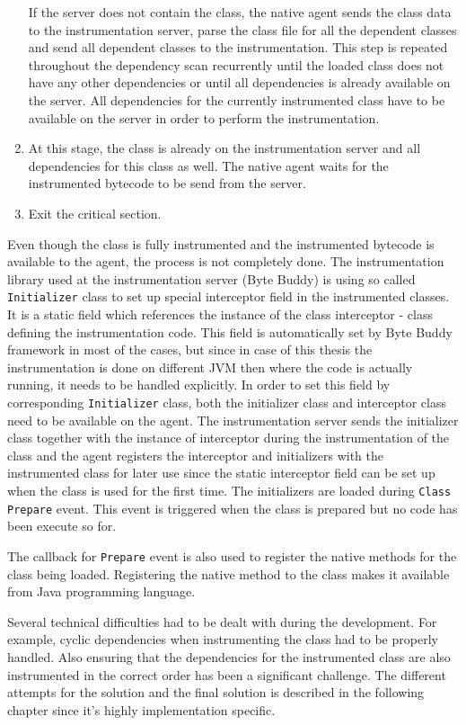 \begin{enumerate}
	If the server does not contain the class, the native agent sends the class data to the instrumentation server, parse the class file for all the dependent classes and send all dependent classes to the instrumentation. This step is repeated throughout the dependency scan recurrently until the loaded class does not have any other dependencies or until all dependencies is already available on the server. All dependencies for the currently instrumented class have to be available on the server in order to perform the instrumentation.

	\item At this stage, the class is already on the instrumentation server and all dependencies for this class as well. The native agent waits for the instrumented bytecode to be send from the server. 
	\item Exit the critical section.
\end{enumerate}	
Even though the class is fully instrumented and the instrumented bytecode is available to the agent, the process is not completely done. The instrumentation library used at the instrumentation server (Byte Buddy) is using so called \texttt{Initializer} class to set up special interceptor field in the instrumented classes. It is a static field which references the instance of the class interceptor - class defining the instrumentation code. This field is automatically set by Byte Buddy framework in most of the cases, but since in case of this thesis the instrumentation is done on different JVM then where the code is actually running, it needs to be handled explicitly. In order to set this field by corresponding \texttt{Initializer} class, both the initializer class and interceptor class need to be available on the agent. The instrumentation server sends the initializer class together with the instance of interceptor during the instrumentation of the class and the agent registers the interceptor and initializers with the instrumented class for later use since the static interceptor field can be set up when the class is used for the first time. The initializers are loaded during  \texttt{Class Prepare} event. This event is triggered when the class is prepared but no code has been execute so for. 

The callback for \texttt{Prepare} event is also used to register the native methods for the class being loaded. Registering the native method to the class makes it available from Java programming language.

Several technical difficulties had to be dealt with during the development. For example,  cyclic dependencies when instrumenting the class had to be properly handled. Also ensuring that the dependencies for the instrumented class are also instrumented in the correct order has been a significant challenge. The different attempts for the solution and the final solution is described in the following chapter since it's highly implementation specific.

